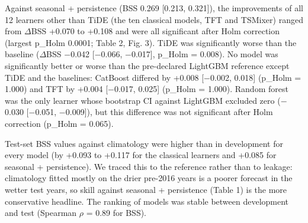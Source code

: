 \documentclass[
]{article}
\begin{document}
Against seasonal + persistence (BSS 0.269 {[}0.213, 0.321{]}), the improvements of all 12 learners other than TiDE (the ten classical models, TFT and TSMixer) ranged from $\Delta$BSS +0.070 to +0.108 and were all significant after Holm correction (largest p\_Holm 0.0001; Table 2, Fig. 3).  %
TiDE was significantly worse than the baseline ($\Delta$BSS $-$0.042 {[}$-$0.066, $-$0.017{]}, p\_Holm = 0.008).  %
No model was significantly better or worse than the pre-declared LightGBM reference except TiDE and the baselines: CatBoost differed by +0.008 {[}$-$0.002, 0.018{]} (p\_Holm = 1.000) and TFT by +0.004 {[}$-$0.017, 0.025{]} (p\_Holm = 1.000).  %
Random forest was the only learner whose bootstrap CI against LightGBM excluded zero ($-$0.030 {[}$-$0.051, $-$0.009{]}), but this difference was not significant after Holm correction (p\_Holm = 0.065).  %

Test-set BSS values against climatology were higher than in development for every model (by +0.093 to +0.117 for the classical learners and +0.085 for seasonal + persistence).  %
We traced this to the reference rather than to leakage: climatology fitted mostly on the drier pre-2016 years is a poorer forecast in the wetter test years, so skill against seasonal + persistence (Table 1) is the more conservative headline. The ranking of models was stable between development and test (Spearman $\rho$ = 0.89 for BSS).  %
\end{document}

